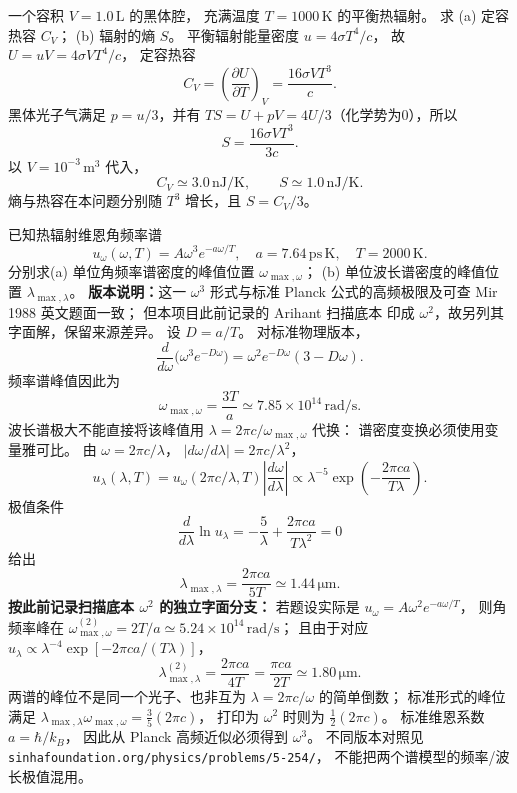 一个容积 $V=1.0\,\mathrm L$ 的黑体腔，
充满温度 $T=1000\,\mathrm K$ 的平衡热辐射。
求 (a) 定容热容 $C_V$；
(b) 辐射的熵 $S$。
\exsolution
平衡辐射能量密度
$u=4\sigma T^4/c$，
故
$U=uV=4\sigma VT^4/c$，
定容热容
\[
 \boxed{C_V=\left(\frac{\partial U}{\partial T}\right)_V
 =\frac{16\sigma VT^3}{c}}.
\]
黑体光子气满足
$p=u/3$，并有
$TS=U+pV=4U/3$（化学势为0），所以
\[
 \boxed{S=\frac{16\sigma VT^3}{3c}}.
\]
以 $V=10^{-3}\,\mathrm{m^3}$ 代入，
\[
 \boxed{C_V\simeq3.0\,\mathrm{nJ/K}},\qquad
 \boxed{S\simeq1.0\,\mathrm{nJ/K}}.
\]
\excheck 熵与热容在本问题分别随
$T^3$ 增长，且 $S=C_V/3$。

已知热辐射维恩角频率谱
\[
 \boxed{u_\omega(\omega,T)=A\omega^3e^{-a\omega/T}},
 \quad a=7.64\,\mathrm{ps\,K},\quad T=2000\,\mathrm K.
\]
分别求(a) 单位角频率谱密度的峰值位置
$\omega_{\max,\omega}$；
(b) 单位波长谱密度的峰值位置
$\lambda_{\max,\lambda}$。
\textbf{版本说明：}这一 $\omega^3$ 形式与标准
Planck 公式的高频极限及可查 Mir 1988 英文题面一致；
但本项目此前记录的 Arihant 扫描底本
印成 $\omega^2$，故另列其字面解，保留来源差异。
\exsolution
设 $D=a/T$。
对标准物理版本，
\[
 \frac{d}{d\omega}
 \bigl(\omega^3e^{-D\omega}\bigr)
 =\omega^2e^{-D\omega}(3-D\omega).
\]
频率谱峰值因此为
\[
 \boxed{\omega_{\max,\omega}=\frac{3T}{a}
  \simeq7.85\times10^{14}\,\mathrm{rad/s}}.
\]
波长谱极大不能直接将该峰值用
$\lambda=2\pi c/\omega_{\max,\omega}$ 代换：
谱密度变换必须使用变量雅可比。
由 $\omega=2\pi c/\lambda$，
$\left|d\omega/d\lambda\right|=2\pi c/\lambda^2$，
\[
 u_\lambda(\lambda,T)=
 u_\omega(2\pi c/\lambda,T)
 \left|\frac{d\omega}{d\lambda}\right|
 \propto\lambda^{-5}
 \exp\!\left(-\frac{2\pi ca}{T\lambda}\right).
\]
极值条件
\[
 \frac{d}{d\lambda}\ln u_\lambda
 =-\frac5\lambda+\frac{2\pi ca}{T\lambda^2}=0
\]
给出
\[
 \boxed{\lambda_{\max,\lambda}
  =\frac{2\pi ca}{5T}
  \simeq1.44\,\mathrm{\mu m}}.
\]
\textbf{按此前记录扫描底本 $\omega^2$
的独立字面分支：}
若题设实际是
$u_\omega=A\omega^2e^{-a\omega/T}$，
则角频率峰在
$\boxed{\omega_{\max,\omega}^{(2)}=2T/a
 \simeq5.24\times10^{14}\,\mathrm{rad/s}}$；
且由于对应
$u_\lambda\propto\lambda^{-4}
 \exp[-2\pi ca/(T\lambda)]$，
\[
 \boxed{\lambda_{\max,\lambda}^{(2)}
 =\frac{2\pi ca}{4T}
 =\frac{\pi ca}{2T}
 \simeq1.80\,\mathrm{\mu m}}.
\]
\excheck
两谱的峰位不是同一个光子、也非互为
$\lambda=2\pi c/\omega$ 的简单倒数；
标准形式的峰位满足
$\lambda_{\max,\lambda}\omega_{\max,\omega}
 =\frac35(2\pi c)$，
打印为 $\omega^2$ 时则为
$\frac12(2\pi c)$。
标准维恩系数 $a=\hbar/k_B$，
因此从 Planck 高频近似必须得到 $\omega^3$。
不同版本对照见
\texttt{sinhafoundation.org/physics/problems/5-254/}，
不能把两个谱模型的频率/波长极值混用。

